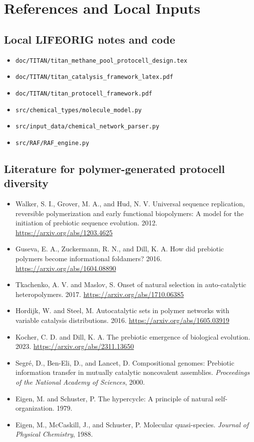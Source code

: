 \documentclass[11pt]{article}
\begin{document}
\section{References and Local Inputs}

\subsection*{Local LIFEORIG notes and code}
\begin{itemize}
\item \texttt{doc/TITAN/titan\_methane\_pool\_protocell\_design.tex}
\item \texttt{doc/TITAN/titan\_catalysis\_framework\_latex.pdf}
\item \texttt{doc/TITAN/titan\_protocell\_framework.pdf}
\item \texttt{src/chemical\_types/molecule\_model.py}
\item \texttt{src/input\_data/chemical\_network\_parser.py}
\item \texttt{src/RAF/RAF\_engine.py}
\end{itemize}

\subsection*{Literature for polymer-generated protocell diversity}

\begin{itemize}
\item Walker, S. I., Grover, M. A., and Hud, N. V. Universal sequence replication, reversible polymerization and early functional biopolymers: A model for the initiation of prebiotic sequence evolution. 2012. \url{https://arxiv.org/abs/1203.4625}
\item Guseva, E. A., Zuckermann, R. N., and Dill, K. A. How did prebiotic polymers become informational foldamers? 2016. \url{https://arxiv.org/abs/1604.08890}
\item Tkachenko, A. V. and Maslov, S. Onset of natural selection in auto-catalytic heteropolymers. 2017. \url{https://arxiv.org/abs/1710.06385}
\item Hordijk, W. and Steel, M. Autocatalytic sets in polymer networks with variable catalysis distributions. 2016. \url{https://arxiv.org/abs/1605.03919}
\item Kocher, C. D. and Dill, K. A. The prebiotic emergence of biological evolution. 2023. \url{https://arxiv.org/abs/2311.13650}
\item Segr\'e, D., Ben-Eli, D., and Lancet, D. Compositional genomes: Prebiotic information transfer in mutually catalytic noncovalent assemblies. \textit{Proceedings of the National Academy of Sciences}, 2000.
\item Eigen, M. and Schuster, P. The hypercycle: A principle of natural self-organization. 1979.
\item Eigen, M., McCaskill, J., and Schuster, P. Molecular quasi-species. \textit{Journal of Physical Chemistry}, 1988.
\end{itemize}
\end{document}
